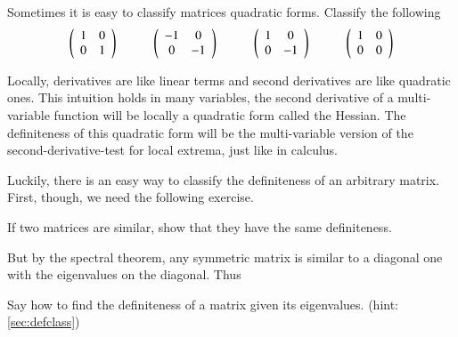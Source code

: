 \documentclass[Main.tex]{subfiles}
\begin{document}
\begin{EasyEx}
  \label{sec:defclass}
  Sometimes it is easy to classify matrices quadratic forms.
  Classify the following
  \[\left(\begin{array}{cc}1 & 0 \\ 0 & 1\end{array}\right)\hspace{10mm}
  \left(\begin{array}{cc}-1 & 0 \\ 0 & -1\end{array}\right)\hspace{10mm}
  \left(\begin{array}{cc}1 & 0 \\ 0 & -1\end{array}\right)\hspace{10mm}
  \left(\begin{array}{cc}1 & 0 \\ 0 & 0\end{array}\right)\]
\end{EasyEx}
\begin{ImportantRemark}
  Locally, derivatives are like linear terms and second derivatives are like quadratic ones.
  This intuition holds in many variables, the second derivative of a multi-variable function will be locally a quadratic form called the Hessian.
  The definiteness of this quadratic form will be the multi-variable version of the second-derivative-test for local extrema, just like in calculus.
\end{ImportantRemark} 
Luckily, there is an easy way to classify the definiteness of an arbitrary matrix.  
First, though, we need the following exercise.  
\begin{ImpEx}
  If two matrices are similar, show that they have the same definiteness.
\end{ImpEx}
But by the spectral theorem, any symmetric matrix is similar to a diagonal one with the eigenvalues on the diagonal.
Thus
\begin{ImpEx}
  Say how to find the definiteness of a matrix given its eigenvalues.
  (hint: \ref{sec:defclass})
\end{ImpEx}


\exersisesu
\end{document}
